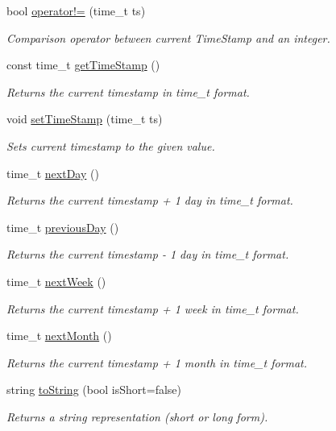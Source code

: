 \begin{CompactItemize}
bool \hyperlink{classTimeStamp_TimeStampa13}{operator!=} (time\_\-t ts)
\begin{CompactList}\small\item\em Comparison operator between current Time\-Stamp and an integer.\item\end{CompactList}\item 
const time\_\-t \hyperlink{classTimeStamp_TimeStampa14}{get\-Time\-Stamp} ()
\begin{CompactList}\small\item\em Returns the current timestamp in time\_\-t format.\item\end{CompactList}\item 
void \hyperlink{classTimeStamp_TimeStampa15}{set\-Time\-Stamp} (time\_\-t ts)
\begin{CompactList}\small\item\em Sets current timestamp to the given value.\item\end{CompactList}\item 
time\_\-t \hyperlink{classTimeStamp_TimeStampa16}{next\-Day} ()
\begin{CompactList}\small\item\em Returns the current timestamp + 1 day in time\_\-t format.\item\end{CompactList}\item 
time\_\-t \hyperlink{classTimeStamp_TimeStampa17}{previous\-Day} ()
\begin{CompactList}\small\item\em Returns the current timestamp - 1 day in time\_\-t format.\item\end{CompactList}\item 
time\_\-t \hyperlink{classTimeStamp_TimeStampa18}{next\-Week} ()
\begin{CompactList}\small\item\em Returns the current timestamp + 1 week in time\_\-t format.\item\end{CompactList}\item 
time\_\-t \hyperlink{classTimeStamp_TimeStampa19}{next\-Month} ()
\begin{CompactList}\small\item\em Returns the current timestamp + 1 month in time\_\-t format.\item\end{CompactList}\item 
string \hyperlink{classTimeStamp_TimeStampa20}{to\-String} (bool is\-Short=false)
\begin{CompactList}\small\item\em Returns a string representation (short or long form).\item\end{CompactList}\end{CompactItemize}
